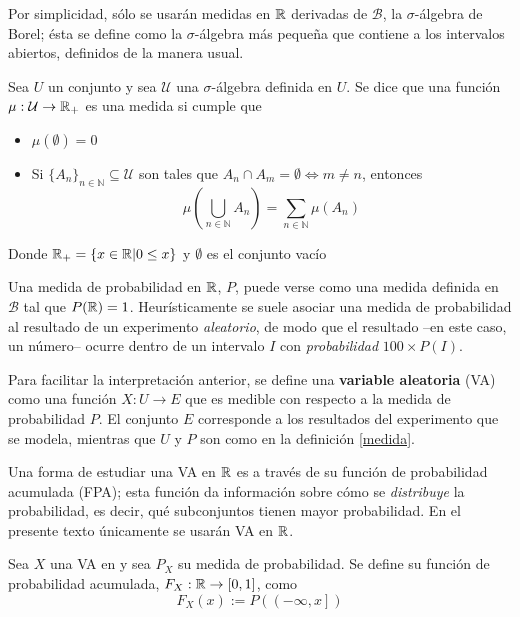Por simplicidad, sólo se usarán medidas en $\mathbb{R}$ derivadas de $\mathcal{B}$, la $\sigma$-álgebra de 
Borel; ésta se define como la $\sigma$-álgebra más pequeña que contiene a los intervalos abiertos, 
definidos de la manera usual. 

\begin{definicion}[Medida]
Sea $U$ un conjunto y sea $\mathcal{U}$ una $\sigma$-álgebra definida en $U$. Se dice que una 
función $\mu : \mathcal{U} \rightarrow \mathbb{R}_+$ es una medida si cumple que
\begin{itemize}
\item $\mu(\emptyset) = 0$
\item Si $\{ A_n \}_{n\in \mathbb{N}} \subseteq \mathcal{U}$ son tales que 
$A_n \cap A_m = \emptyset \Leftrightarrow m\neq n$, entonces
$$ \mu\left( \bigcup_{n\in \mathbb{N}} A_n \right) = \sum_{n\in \mathbb{N}} \mu(A_n)$$
\end{itemize}
Donde $\mathbb{R}_+ = \{ x\in \mathbb{R} | 0 \leq x \}$ y $\emptyset$ es el conjunto vacío
\label{medida}
\end{definicion}

Una medida de probabilidad en $\mathbb{R}$, $P$, puede verse como una medida definida en $\mathcal{B}$ tal
que $P(\mathbb{R}) = 1$. 
%
Heurísticamente se suele asociar una medida de probabilidad al resultado de un experimento 
\textit{aleatorio}, de modo que el resultado --en este caso, un número-- ocurre dentro de un 
intervalo $I$ con \textit{probabilidad} $100 \times P(I)$.

Para facilitar la interpretación anterior, se define una \textbf{variable aleatoria} (VA) como una 
función $X : U \rightarrow E$ que es medible con respecto a la medida de probabilidad $P$.
%
El conjunto $E$ corresponde a los resultados del experimento que se modela, mientras que $U$ y $P$ 
son como en la definición \ref{medida}.

Una forma de estudiar una VA en $\mathbb{R}$ es a través de su función de probabilidad acumulada (FPA);
esta función da información sobre cómo se \textit{distribuye} la probabilidad, es decir, qué
subconjuntos tienen mayor probabilidad. 
%
En el presente texto únicamente se usarán VA en $\mathbb{R}$.

\begin{definicion}
Sea $X$ una VA en y sea $P_X$ su medida de probabilidad. Se define su función de 
probabilidad acumulada, $F_X : \mathbb{R} \rightarrow [0,1]$, como
\begin{equation*}
F_X (x) := P\left( \left(-\infty,x \right] \right)
\end{equation*}
\end{definicion}

